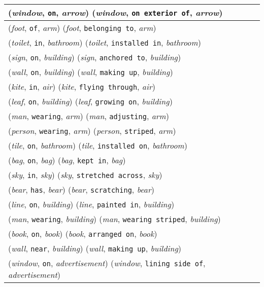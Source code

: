 \documentclass[runningheads]{llncs}
\begin{document}
{\begin{longtable}{ l }
(\textit{window}, \texttt{on}, \textit{arrow})  (\textit{window}, \texttt{on exterior of}, \textit{arrow}) \\ \hline
(\textit{foot}, \texttt{of}, \textit{arm})  (\textit{foot}, \texttt{belonging to}, \textit{arm}) \\ \hline
(\textit{toilet}, \texttt{in}, \textit{bathroom})  (\textit{toilet}, \texttt{installed in}, \textit{bathroom}) \\ \hline
(\textit{sign}, \texttt{on}, \textit{building})  (\textit{sign}, \texttt{anchored to}, \textit{building}) \\ \hline
(\textit{wall}, \texttt{on}, \textit{building})  (\textit{wall}, \texttt{making up}, \textit{building}) \\ \hline
(\textit{kite}, \texttt{in}, \textit{air})  (\textit{kite}, \texttt{flying through}, \textit{air}) \\ \hline
(\textit{leaf}, \texttt{on}, \textit{building})  (\textit{leaf}, \texttt{growing on}, \textit{building}) \\ \hline
(\textit{man}, \texttt{wearing}, \textit{arm})  (\textit{man}, \texttt{adjusting}, \textit{arm}) \\ \hline
(\textit{person}, \texttt{wearing}, \textit{arm})  (\textit{person}, \texttt{striped}, \textit{arm}) \\ \hline
(\textit{tile}, \texttt{on}, \textit{bathroom})  (\textit{tile}, \texttt{installed on}, \textit{bathroom}) \\ \hline
(\textit{bag}, \texttt{on}, \textit{bag})  (\textit{bag}, \texttt{kept in}, \textit{bag}) \\ \hline
(\textit{sky}, \texttt{in}, \textit{sky})  (\textit{sky}, \texttt{stretched across}, \textit{sky}) \\ \hline
(\textit{bear}, \texttt{has}, \textit{bear})  (\textit{bear}, \texttt{scratching}, \textit{bear}) \\ \hline
(\textit{line}, \texttt{on}, \textit{building})  (\textit{line}, \texttt{painted in}, \textit{building}) \\ \hline
(\textit{man}, \texttt{wearing}, \textit{building})  (\textit{man}, \texttt{wearing striped}, \textit{building}) \\ \hline
(\textit{book}, \texttt{on}, \textit{book})  (\textit{book}, \texttt{arranged on}, \textit{book}) \\ \hline
(\textit{wall}, \texttt{near}, \textit{building})  (\textit{wall}, \texttt{making up}, \textit{building}) \\ \hline
(\textit{window}, \texttt{on}, \textit{advertisement})  (\textit{window}, \texttt{lining side of}, \textit{advertisement}) \\ \hline

\end{longtable}}
\end{document}
